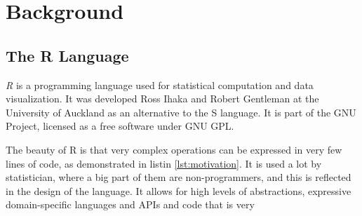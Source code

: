 \chapter{Background}

\begin{chapterabstract}
	\todoadd
\end{chapterabstract}

\section{The R Language}

\textit{R}\cite{r} is a programming language used for statistical computation and data visualization. It was developed Ross Ihaka and Robert Gentleman at the University of Auckland as an alternative to the S language. It is part of the GNU Project, licensed as a free software under GNU GPL.

The beauty of R is that very complex operations can be expressed in very few lines of code, as demonstrated in listin \ref{lst:motivation}. It is used a lot by statistician, where a big part of them are non-programmers, and this is reflected in the design of the language. It allows for high levels of abstractions, expressive domain-specific languages and APIs and code that is very

